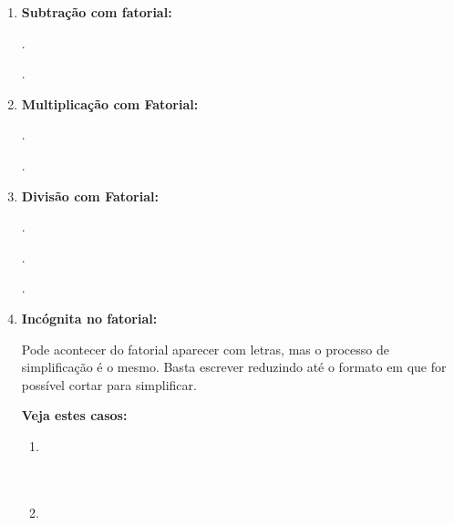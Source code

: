 \begin{multicols*}{2}
\begin{enumerate}
		      .

		      .

		\item \textbf{Subtração com fatorial:}

		      .

		      .


		\item \textbf{Multiplicação com Fatorial:}

		      .

		      .

		\item \textbf{Divisão com Fatorial:}

		      .

		      .

		      .

		\item \textbf{Incógnita no fatorial:}

		      Pode acontecer do fatorial aparecer com letras, mas o processo de simplificação é o mesmo. Basta escrever reduzindo até o formato em que for possível cortar para simplificar.

		      \textbf{Veja estes casos:}

		      \begin{enumerate}

			      \item 	{}\\

			            \\

			            \\

			      \item 	{}\\


\end{enumerate}
\end{enumerate}
\end{multicols*}
